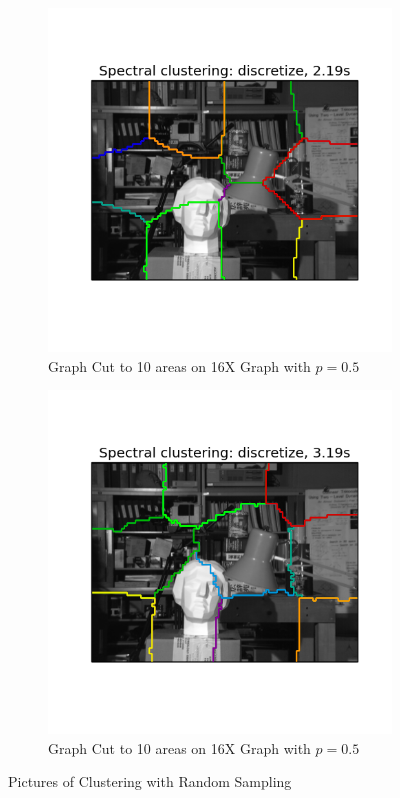 \begin{figure}[h!]
        \begin{subfigure}[h]{0.48\textwidth}
                \includegraphics[width=\textwidth]{fig/592_random_0_1_10.png}
                \caption{Graph Cut to 10 areas on 16X Graph with $p = 0.5$}
                \label{fig:graphcut_random_01_10}
        \end{subfigure}
        \begin{subfigure}[h]{0.48\textwidth}
                \includegraphics[width=\textwidth]{fig/592_random_0_5_10.png}
                \caption{Graph Cut to 10 areas on 16X Graph with $p = 0.5$}
                \label{fig:graphcut_random_05_10}
        \end{subfigure}
        \caption{Pictures of Clustering with Random Sampling}\label{fig:graphcut_random}
\end{figure}

